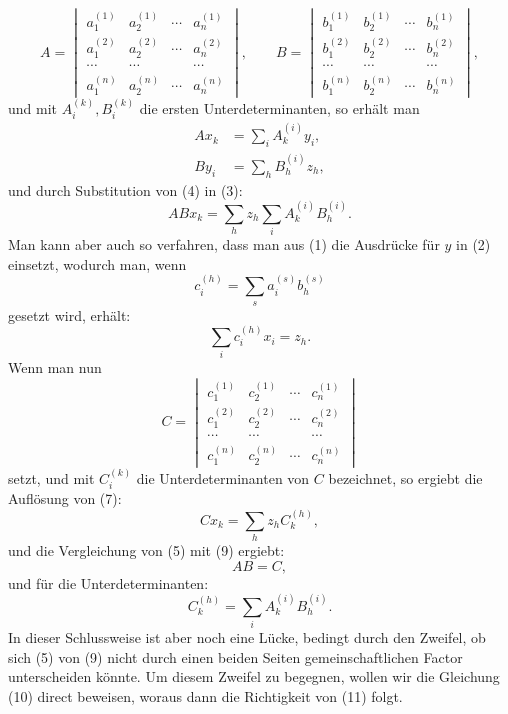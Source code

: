 
\[
A=\begin{vmatrix}
 a_1^{(1)}&a_2^{(1)}&\cdots&a_n^{(1)}\\
 a_1^{(2)}&a_2^{(2)}&\cdots&a_n^{(2)}\\
 \cdots&\cdots&&\cdots\\
 a_1^{(n)}&a_2^{(n)}&\cdots&a_n^{(n)}
\end{vmatrix},\qquad
B=\begin{vmatrix}
 b_1^{(1)}&b_2^{(1)}&\cdots&b_n^{(1)}\\
 b_1^{(2)}&b_2^{(2)}&\cdots&b_n^{(2)}\\
 \cdots&\cdots&&\cdots\\
 b_1^{(n)}&b_2^{(n)}&\cdots&b_n^{(n)}
\end{vmatrix},
\]
und mit $A_i^{(k)},B_i^{(k)}$ die ersten Unterdeterminanten, so erhält man
\begin{align}
 A x_k&=\sum_i A_k^{(i)}y_i,\tag{3}\\
 B y_i&=\sum_h B_h^{(i)}z_h,\tag{4}
\end{align}
und durch Substitution von (4) in (3):
\begin{equation}
 ABx_k=\sum_h z_h\sum_i A_k^{(i)}B_h^{(i)}.\tag{5}
\end{equation}
Man kann aber auch so verfahren, dass man aus (1) die Ausdrücke für $y$ in (2) einsetzt, wodurch man, wenn
\begin{equation}
 c_i^{(h)}=\sum_s a_i^{(s)}b_h^{(s)}\tag{6}
\end{equation}
gesetzt wird, erhält:
\begin{equation}
 \sum_i c_i^{(h)}x_i=z_h.\tag{7}
\end{equation}
Wenn man nun
\[
C=\begin{vmatrix}
 c_1^{(1)}&c_2^{(1)}&\cdots&c_n^{(1)}\\
 c_1^{(2)}&c_2^{(2)}&\cdots&c_n^{(2)}\\
 \cdots&\cdots&&\cdots\\
 c_1^{(n)}&c_2^{(n)}&\cdots&c_n^{(n)}
\end{vmatrix}\tag{8}
\]
setzt, und mit $C_i^{(k)}$ die Unterdeterminanten von $C$ bezeichnet, so ergiebt die Auflösung von (7):
\begin{equation}
 Cx_k=\sum_h z_h C_k^{(h)},\tag{9}
\end{equation}
und die Vergleichung von (5) mit (9) ergiebt:
\begin{equation}
 AB=C,\tag{10}
\end{equation}
und für die Unterdeterminanten:
\begin{equation}
 C_k^{(h)}=\sum_i A_k^{(i)}B_h^{(i)}.\tag{11}
\end{equation}
In dieser Schlussweise ist aber noch eine Lücke, bedingt durch den Zweifel, ob sich (5) von (9) nicht durch einen beiden Seiten gemeinschaftlichen Factor unterscheiden könnte. Um diesem Zweifel zu begegnen, wollen wir die Gleichung (10) direct beweisen, woraus dann die Richtigkeit von (11) folgt.
